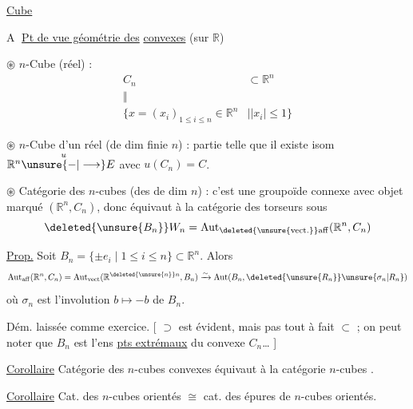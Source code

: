 \uline{Cube}

\textcircled{A} \uline{Pt de vue géométrie des}  \uline{convexes} (sur $\mathbb R$)

$\circledast$ $n$-Cube  (réel) :
\[
\begin{aligned}
 C_n&\subset\mathbb R^n\\[-2pt]
 \Vert\quad&\\[-4pt]
 \{x=(x_i)_{1\leq i\leq n}\in\mathbb R^n&\mid |x_i|\leq1\}
\end{aligned}
\]

$\circledast$ $n$-Cube  d'un   réel  (de dim finie $n$) : partie
telle que il existe isom  $\mathbb R^n\overset{u}{\unsure{-|\longrightarrow}}E$ avec $u(C_n)=C$.

$\circledast$ Catégorie des $n$-cubes   (des   de dim $n$) :
 c'est une groupoïde connexe avec objet
marqué  $(\mathbb R^n,C_n)$, donc équivaut à la
catégorie des torseurs sous
\[
 \deleted{\unsure{B_n}} W_n=\mathrm{Aut}_{\deleted{\unsure{\mathrm{vect}.}}\mathrm{aff}}(\mathbb R^n,C_n)
\]

\uline{Prop.} Soit $B_n=\{\pm e_i\mid 1\leq i\leq n\}\subset\mathbb R^n$. Alors
\[
 \mathrm{Aut}_{\mathrm{aff}}(\mathbb R^n,C_n)=\mathrm{Aut}_{\mathrm{vect}}(\mathbb R^{\deleted{\unsure{n}}n},B_n)
 \xrightarrow{\sim}\mathrm{Aut}(B_n,\deleted{\unsure{R_n}}\unsure{\sigma_n|R_n})
\]
où $\sigma_n$ est l'involution $b\mapsto-b$ de $B_n$.

 Dém. laissée comme exercice. [ $\supset$ est
évident, mais pas tout à fait $\subset$ ; on peut noter
que $B_n$ est l'ens  \uline{pts extrémaux} du
convexe $C_n$\ldots{} ]

\uline{Corollaire} Catégorie des $n$-cubes convexes équivaut
à  la catégorie   $n$-cubes .

\uline{Corollaire} Cat. des $n$-cubes orientés $\cong$ cat. des épures
de $n$-cubes  orientés.
